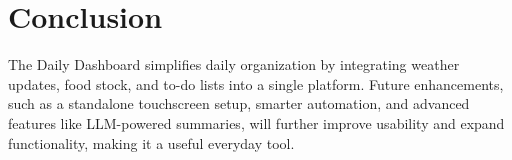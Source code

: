 \section{Conclusion}\label{sec:Conclusion}
The Daily Dashboard simplifies daily organization by integrating weather updates, food stock, and to-do lists into a single platform. Future enhancements, such as a standalone touchscreen setup, smarter automation, and advanced features like LLM-powered summaries, will further improve usability and expand functionality, making it a useful everyday tool.
